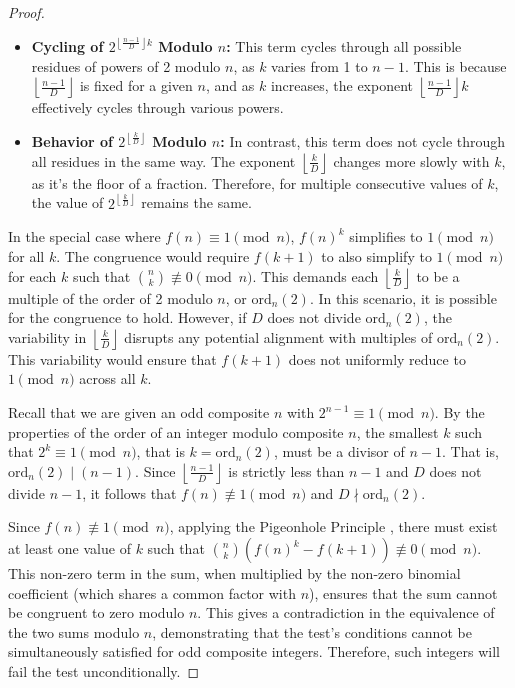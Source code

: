 \documentclass{article}
\theoremstyle{plain}
\theoremstyle{definition}
\begin{document}
\begin{proof}
    \begin{itemize}
        \item \textbf{Cycling of \( 2^{\left\lfloor \frac{n-1}{D} \right\rfloor k} \) Modulo \( n \):} This term cycles through all possible residues of powers of 2 modulo \( n \), as \( k \) varies from 1 to \( n-1 \). This is because \( \left\lfloor \frac{n-1}{D} \right\rfloor \) is fixed for a given \( n \), and as \( k \) increases, the exponent \( \left\lfloor \frac{n-1}{D} \right\rfloor k \) effectively cycles through various powers.
        \item \textbf{Behavior of \( 2^{\left\lfloor \frac{k}{D} \right\rfloor} \) Modulo \( n \):} In contrast, this term does not cycle through all residues in the same way. The exponent \( \left\lfloor \frac{k}{D} \right\rfloor \) changes more slowly with \( k \), as it's the floor of a fraction. Therefore, for multiple consecutive values of \( k \), the value of \( 2^{\left\lfloor \frac{k}{D} \right\rfloor} \) remains the same.
    \end{itemize}    
    
    In the special case where \( f(n) \equiv 1 \pmod{n} \), \( f(n)^k \) simplifies to \( 1 \pmod{n} \) for all \( k \). The congruence would require \( f(k+1) \) to also simplify to \( 1 \pmod{n} \) for each \( k \) such that \( \binom{n}{k} \not\equiv 0 \pmod{n} \). This demands each \( \left\lfloor \frac{k}{D} \right\rfloor \) to be a multiple of the order of 2 modulo \( n \), or \( \text{ord}_n(2) \). In this scenario, it is possible for the congruence to hold. However, if \( D \) does not divide \( \text{ord}_n(2) \), the variability in \( \left\lfloor \frac{k}{D} \right\rfloor \) disrupts any potential alignment with multiples of \( \text{ord}_n(2) \). This variability would ensure that \( f(k+1) \) does not uniformly reduce to \( 1 \pmod{n} \) across all \( k \).
    
    Recall that we are given an odd composite $n$ with $2^{n-1} \equiv 1 \pmod{n}$. By the properties of the order of an integer modulo composite $n$, the smallest $k$ such that $2^k \equiv 1 \pmod{n}$, that is $k = \text{ord}_n(2)$, must be a divisor of $n-1$. That is, $\text{ord}_n(2) \mid (n-1)$. Since $\left\lfloor\frac{n-1}{D}\right\rfloor$ is strictly less than $n-1$ and $D$ does not divide $n-1$, it follows that $f(n) \not\equiv 1 \pmod{n}$ and \( D \nmid \text{ord}_n(2) \).
        
    Since \( f(n) \not\equiv 1 \pmod{n} \), applying the Pigeonhole Principle \cite{rosen2012}, there must exist at least one value of \( k \) such that \( \binom{n}{k} \left(f(n)^k - f(k+1)\right) \not\equiv 0 \pmod{n} \). This non-zero term in the sum, when multiplied by the non-zero binomial coefficient (which shares a common factor with $n$), ensures that the sum cannot be congruent to zero modulo \( n \). This gives a contradiction in the equivalence of the two sums modulo \( n \), demonstrating that the test's conditions cannot be simultaneously satisfied for odd composite integers. Therefore, such integers will fail the test unconditionally.
\end{proof}
\end{document}
